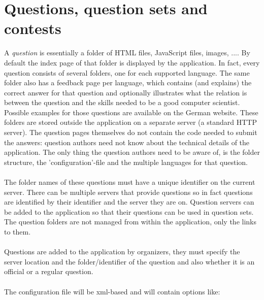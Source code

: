 \section*{Questions, question sets and contests}

	A \emph{question} is essentially a folder of HTML files, JavaScript files, images, ....
	By default the index page of that folder is displayed by the application. In fact,
	every question consists of several folders, one for each supported language. The same
	folder also has a feedback page per language, which contains (and explains) the
	correct answer for that question and optionally illustrates what the relation is
	between the question and the skills needed to be a good computer scientist.
	Possible examples for those questions are available on the German website.
	These folders are stored outside the application on a separate server (a standard
	HTTP server). The question pages themselves do not contain the code needed to submit
	the answers: question authors need not know about the technical details of the
	application. The only thing the question authors need to be aware of, is the folder
	structure, the 'configuration'-file and the multiple languages for that question. \\
	\\
	The folder names of these questions must have a unique identifier on the current
	server. There can be multiple servers that provide questions so in fact questions
	are identified by their identifier and the server they are on. Question servers can be
	added to the application so that their questions can be used in question sets. The
	question folders are not managed from within the application, only the links to them.
	\\
	\\
	Questions are added to the application by organizers, they must specify the server
	location and the folder/identifier of the question and also whether it is an official
	or a regular question. 
	\\
	\\
	The configuration file will be xml-based and will contain options like:
